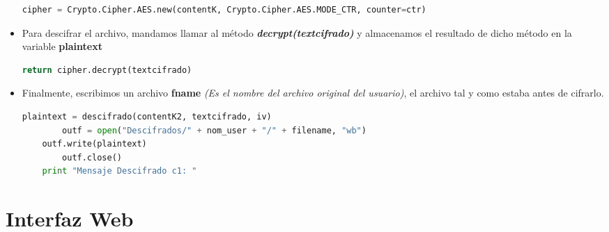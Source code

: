 \begin{itemize}
\begin{lstlisting}[language=Python,frame=single, keywordstyle=\color{blue},breaklines=true,showstringspaces=false]
cipher = Crypto.Cipher.AES.new(contentK, Crypto.Cipher.AES.MODE_CTR, counter=ctr)
\end{lstlisting}


		\item Para descifrar el archivo, mandamos llamar al método \textbf{\textit{decrypt(textcifrado)}}  y almacenamos el resultado de dicho método en la variable \textbf{plaintext}
		
\begin{lstlisting}[language=Python,frame=single, keywordstyle=\color{blue},breaklines=true,showstringspaces=false]
    	return cipher.decrypt(textcifrado)
\end{lstlisting}

		\item Finalmente, escribimos un archivo \textbf{fname} \textit{(Es el nombre del archivo original del usuario)}, el archivo tal y como estaba antes de cifrarlo. 
			
\begin{lstlisting}[language=Python,frame=single, keywordstyle=\color{blue},breaklines=true,showstringspaces=false]
	plaintext = descifrado(contentK2, textcifrado, iv)
    	outf = open("Descifrados/" + nom_user + "/" + filename, "wb")
   	outf.write(plaintext)
    	outf.close()
   	print "Mensaje Descifrado c1: "
\end{lstlisting}

\end{itemize}

\section{Interfaz Web}

